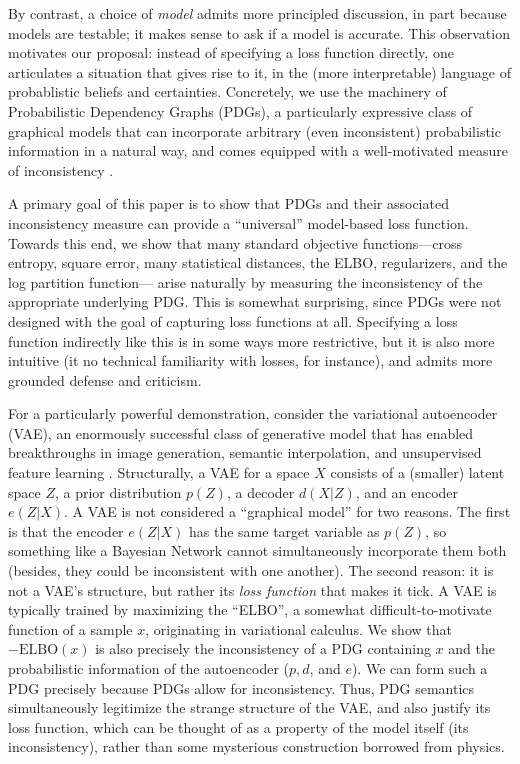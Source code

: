 By contrast, a choice of \emph{model} admits more principled
discussion, in part because
models are testable; it makes sense to ask if a model is accurate.
This observation motivates our proposal: instead of specifying a loss function directly,
one articulates a situation that gives rise to it, in the (more
interpretable) language of probablistic beliefs and certainties. %
Concretely, we use the machinery of Probabilistic Dependency Graphs (PDGs),
a particularly expressive class of graphical models that can incorporate arbitrary (even inconsistent) probabilistic information in a natural way, and comes equipped with
a well-motivated measure of inconsistency  \parencite{pdg-aaai}.

A primary goal of this paper is to show that PDGs and their associated inconsistency measure can provide a ``universal'' model-based loss function.
Towards this end, we show that many standard objective functions---cross
entropy, square error, many statistical distances, the ELBO,
regularizers, and the log partition function---%
arise naturally by measuring the inconsistency of
the appropriate underlying PDG.
This is somewhat surprising, since PDGs were not designed with the
goal of capturing loss functions at all.
Specifying a loss function indirectly like this is in some ways more restrictive,
but it is also more intuitive
(it no technical familiarity with losses, for instance),
and admits more grounded defense and criticism.



For a particularly powerful demonstration, consider the variational
autoencoder (VAE), an enormously successful class of generative model
that has enabled breakthroughs in image generation, semantic
interpolation, and unsupervised feature learning
\parencite{kingma2013autoencoding}.
Structurally, a VAE for a space $X$ consists of a (smaller) latent space $Z$, a prior distribution $p(Z)$, a decoder $d(X | Z)$, and an encoder $e(Z| X)$.
A VAE is not considered a ``graphical model'' for two reasons.
The first is that the encoder $e(Z|X)$ has the same target variable as $p(Z)$, so
something like a Bayesian Network
cannot simultaneously incorporate them both
	(besides, they could be inconsistent with one another).
The second reason: it is not a VAE's structure, but rather its \emph{loss function} that makes
it tick.
A VAE is typically trained by
maximizing the ``ELBO'',
    a somewhat difficult-to-motivate function of a sample $x$, originating in variational calculus.
    We show that $-\mathrm{ELBO}(x)$ is also
    precisely the inconsistency of a PDG containing
	$x$
	and the probabilistic
    information of the autoencoder ($p, d$, and $e$).
We can form such a PDG precisely because PDGs allow for inconsistency.
Thus, PDG semantics simultaneously legitimize the strange structure of
the VAE, and also justify its loss function, which can be thought of
as a property of the model itself (its inconsistency), rather than
some mysterious construction borrowed from physics.




